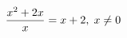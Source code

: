 \documentclass[preview]{standalone}
\begin{document}
\begin{align*}
\special{dvisvgm:raw <g id='unique000'>}\frac{x^2+2x}{x}=x+2,\;x\neq 0\special{dvisvgm:raw </g>}
\end{align*}
\end{document}
